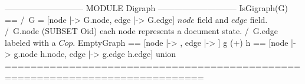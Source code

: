 \documentclass{article}
\begin{document}
\begin{tla}
----------------------------- MODULE Digraph -----------------------------
IsGigraph(G) == 
    /\ G = [node |-> G.node, edge |-> G.edge] \* $node$ field and $edge$ field.
    /\ G.node \subseteq (SUBSET Oid) \* each node represents a document state.
    /\ G.edge  \* labeled with a $Cop$.
EmptyGraph == [node |-> {{}}, edge |-> {}]
g (+) h == [node |-> g.node \cup h.node, edge |-> g.edge \cup h.edge] \* union
=============================================================================
\end{tla}
\end{document}
